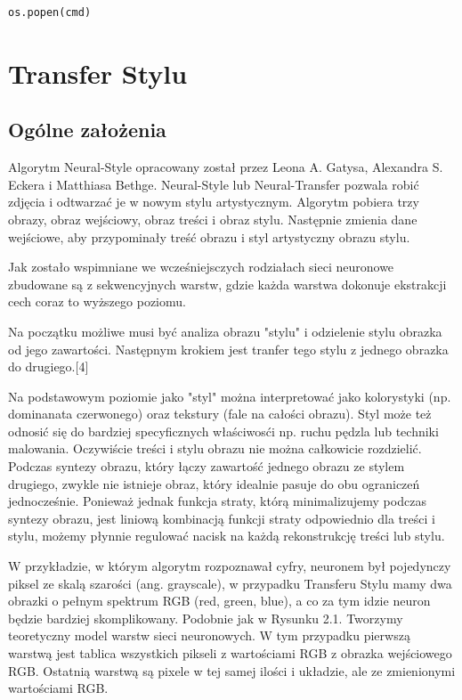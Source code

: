 \documentclass[brudnopis]{xmgr}
\begin{document}
\begin{lstlisting}
os.popen(cmd)
\end{lstlisting}



\chapter{Transfer Stylu }

\section{Ogólne założenia\label{s:dsssl}}

Algorytm Neural-Style opracowany został przez Leona A. Gatysa, Alexandra S. Eckera i Matthiasa Bethge. Neural-Style lub Neural-Transfer pozwala robić zdjęcia i odtwarzać je w nowym stylu artystycznym. Algorytm pobiera trzy obrazy, obraz wejściowy, obraz treści i obraz stylu. Następnie zmienia dane wejściowe, aby przypominały treść obrazu i styl artystyczny obrazu stylu.

Jak zostało wspimniane we wcześniejsczych rodziałach sieci neuronowe zbudowane są z sekwencyjnych warstw, gdzie każda warstwa dokonuje ekstrakcji cech coraz to wyższego poziomu.

Na początku możliwe musi być analiza obrazu "stylu" i odzielenie stylu obrazka od jego zawartości. 
Następnym krokiem jest tranfer tego stylu z jednego obrazka do drugiego.[4]

Na podstawowym poziomie jako "styl" można interpretować jako  kolorystyki (np. dominanata czerwonego) oraz tekstury (fale na całości obrazu).
Styl może też odnosić się do bardziej specyficznych właściwosći np. ruchu pędzla lub techniki malowania. Oczywiście treści i stylu obrazu nie można całkowicie rozdzielić. Podczas syntezy obrazu, który łączy zawartość jednego obrazu ze stylem drugiego, zwykle nie istnieje obraz, który idealnie pasuje do obu ograniczeń jednocześnie. Ponieważ jednak funkcja straty, którą minimalizujemy podczas syntezy obrazu, jest liniową kombinacją funkcji straty odpowiednio dla treści i stylu, możemy płynnie regulować nacisk na każdą rekonstrukcję treści lub stylu.

W przykładzie, w którym algorytm rozpoznawał cyfry, neuronem był pojedynczy piksel ze skalą szarości (ang. grayscale), w przypadku Transferu Stylu mamy dwa obrazki o pełnym  spektrum RGB (red, green, blue), a co za tym idzie neuron będzie bardziej skomplikowany. Podobnie jak w Rysunku 2.1. Tworzymy teoretyczny model warstw sieci neuronowych. W tym przypadku pierwszą  warstwą jest tablica wszystkich pikseli z wartościami RGB z obrazka wejściowego RGB. Ostatnią warstwą  są pixele w tej samej ilości i układzie, ale ze zmienionymi wartościami RGB. 
\end{document}
